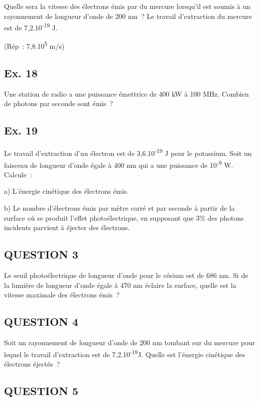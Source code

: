 {{{Quelle sera la vitesse des électrons émis par du mercure lorsqu'il est
soumis à un rayonnement de longueur d'onde de 200 nm~? Le travail
d'extraction du mercure est de 7,2.10\textsuperscript{-19} J.

(Rép~: 7,8.10\textsuperscript{5} m/s)

\subsection{Ex. 18}

Une station de radio a une puissance émettrice de 400 kW à 100 MHz.
Combien de photons par seconde sont émis~?

\subsection{Ex. 19}

Le travail d'extraction d'un électron est de 3,6.10\textsuperscript{-19}
J pour le potassium. Soit un faisceau de longueur d'onde égale à 400 nm
qui a une puissance de 10\textsuperscript{-9} W. Calcule~:

a) L'énergie cinétique des électrons émis.

b) Le nombre d'électrons émis par mètre carré et par seconde à partir de
la surface où se produit l'effet photoélectrique, en supposant que 3\%
des photons incidents parvient à éjecter des électrons.

\subsection{QUESTION 3}

Le seuil photoélectrique de longueur d'onde pour le césium est de 686
nm. Si de la lumière de longueur d'onde égale à 470 nm éclaire la
surface, quelle est la vitesse maximale des électrons émis~?

\subsection{QUESTION 4}

Soit un rayonnement de longueur d'onde de 200 nm tombant sur du mercure
pour lequel le travail d'extraction est de 7,2.10\textsuperscript{-19}J.
Quelle est l'énergie cinétique des électrons éjectés~?

\subsection{QUESTION 5}

}}}
